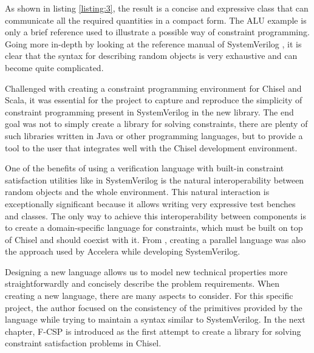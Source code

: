 As shown in listing \ref{listing:3}, the result is a concise and expressive
class that can communicate all the required quantities in a compact form. The
ALU example is only a brief reference used to illustrate a possible way of
constraint programming. Going more in-depth by looking at the reference manual
of SystemVerilog \cite{ieee2017ieee}, it is clear that the syntax for describing
random objects is very exhaustive and can become quite complicated.

Challenged with creating a constraint programming environment for Chisel and
Scala, it was essential for the project to capture and reproduce the simplicity
of constraint programming present in SystemVerilog in the new library. The end
goal was not to simply create a library for solving constraints, there are
plenty of such libraries written in Java or other programming languages, but to
provide a tool to the user that integrates well with the Chisel development
environment.

One of the benefits of using a verification language with built-in constraint
satisfaction utilities like in SystemVerilog is the natural interoperability
between random objects and the whole environment. This natural interaction is
exceptionally significant because it allows writing very expressive test benches
and classes. The only way to achieve this interoperability between components is
to create a domain-specific language for constraints, which must be built on top
of Chisel and should coexist with it. From \cite{sutherland2003overview},
creating a parallel language was also the approach used by Accelera while
developing SystemVerilog.

Designing a new language allows us to model new technical properties more
straightforwardly and concisely describe the problem requirements. When creating
a new language, there are many aspects to consider. For this specific project,
the author focused on the consistency of the primitives provided by the language
while trying to maintain a syntax similar to SystemVerilog. In the next chapter,
F-CSP is introduced as the first attempt to create a library for solving
constraint satisfaction problems in Chisel.
